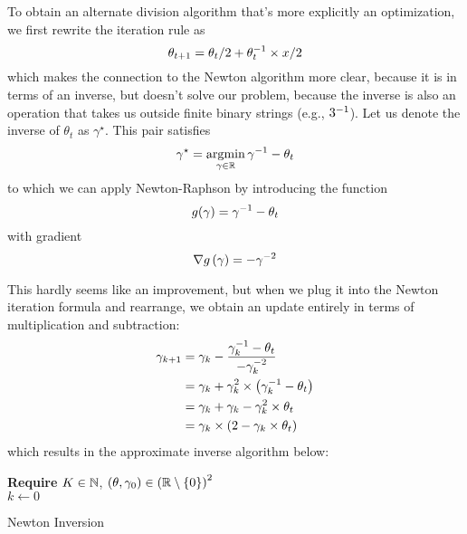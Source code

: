 \documentclass[../../thesis.tex]{subfiles}
\begin{document}
To obtain an alternate division algorithm
that's more explicitly an optimization,
we first rewrite the iteration rule as
\begin{equation}\equationlabel{babylon-inv-iter}
	\theta_{t+1} = \theta_t / 2 + \inv{\theta_t} \times x / 2
\end{equation}
\noindent which makes the connection
to the Newton algorithm more clear,
because it is in terms of an inverse,
but doesn't solve our problem,
because the inverse is also an operation
that takes us outside finite binary strings
(e.g., $3^{-1}$).
Let us denote the inverse of $\theta_t$
as $\gamma^\star$.
This pair satisfies
\begin{equation}
	\gamma^\star = \mathop{\mathrm{argmin}}_{\gamma \in \mathbb{R}} \gamma^{-1} - \theta_t
\end{equation}
\noindent
to which we can apply Newton-Raphson
by introducing the function
\begin{equation}
	g(\gamma) = \gamma^{-1} - \theta_t
\end{equation}
\noindent with gradient
\begin{equation}
	\nabla g\left(\gamma\right) = -\gamma^{-2}
\end{equation}

This hardly seems like an improvement,
but when we plug it into the Newton iteration formula
and rearrange,
we obtain an update entirely in terms of
multiplication and subtraction:
\begin{align}
	\gamma_{k+1}
	&= \gamma_k - \frac{\gamma_k^{-1} - \theta_t}{-\gamma_k^{-2}}\\
	&= \gamma_k + \gamma_k^2 \times \left(\gamma_k^{-1} - \theta_t\right)\\
	&= \gamma_k + \gamma_k - \gamma_k^2\times \theta_t\\
	&= \gamma_k \times \left(2 - \gamma_k \times \theta_t\right)
\end{align}
\noindent which results in the approximate inverse algorithm below:
\\
\begin{algorithm}[H]
    \SetAlgoLined{}
    \textbf{Require}
    $K\in \mathbb{N}$, $(\theta, \gamma_0) \in {\left(\mathbb{R}\setminus \left\{0\right\} \right)}^2 $\ \\
    $k \leftarrow 0$\\
    \caption{Newton Inversion}
\end{algorithm}
\end{document}
